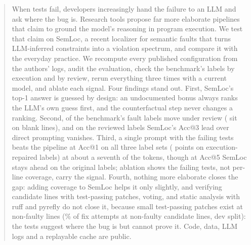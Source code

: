 \begin{abstract}
When tests fail, developers increasingly hand the failure to an LLM and ask where the bug is. Research tools propose
far more elaborate pipelines that claim to ground the model's reasoning in program execution. We test that claim on
SemLoc, a recent localizer for semantic faults that turns LLM-inferred constraints into a violation spectrum, and
compare it with the everyday practice. We recompute every published configuration from the authors' logs, audit the
evaluation, check the benchmark's labels by execution and by review, rerun everything three times with a current model,
and ablate each signal. Four findings stand out. First, SemLoc's top-1 answer is guessed by design: an undocumented bonus
always ranks the LLM's own guess first, and the counterfactual step never changes a ranking. Second,
\LabaudAllMoved{} of the benchmark's \LabaudAllN{} fault labels move under review (\LabaudAllBlank{} sit on blank lines),
and on the reviewed labels SemLoc's Acc@3 lead over direct prompting vanishes. Third, a single prompt with the failing tests beats the pipeline at Acc@1 on all
three label sets (\RqTwoRepairedAllLlmTestsDAccOne{} points on execution-repaired labels) at about a seventh of the
tokens, though at Acc@5 SemLoc stays ahead on the original labels; ablation shows the failing tests, not per-line coverage, carry the signal. Fourth, nothing more elaborate
closes the gap: adding coverage to SemLoc helps it only slightly, and verifying candidate lines with test-passing
patches, voting, and static analysis with ruff and pyrefly do not close it, because small test-passing patches exist at
non-faulty lines (\PavmechReviewedOtherLineFixable\% of fix attempts at non-faulty candidate lines, dev split): the tests suggest where the
bug is but cannot prove it. Code, data, LLM logs and a replayable cache are public.
\end{abstract}
